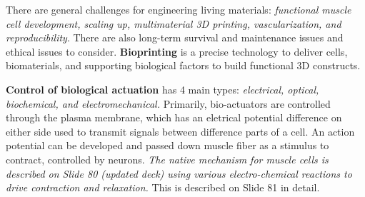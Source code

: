 \documentclass[onecolumn,a4paper]{article}
\begin{document}
There are general challenges for engineering living materials: \emph{functional muscle cell development, scaling up, multimaterial 3D printing, vascularization, and reproducibility}. There are also long-term survival and maintenance issues and ethical issues to consider. \textbf{Bioprinting} is a precise technology to deliver cells, biomaterials, and supporting biological factors to build functional 3D constructs. 

\textbf{Control of biological actuation} has 4 main types: \emph{electrical, optical, biochemical, and electromechanical.} Primarily, bio-actuators are controlled through the plasma membrane, which has an eletrical potential difference on either side used to transmit signals between difference parts of a cell. An action potential can be developed and passed down muscle fiber as a stimulus to contract, controlled by neurons. \emph{The native mechanism for muscle cells is described on Slide 80 (updated deck) using various electro-chemical reactions to drive contraction and relaxation.} This is described on Slide 81 in detail.
\end{document}
